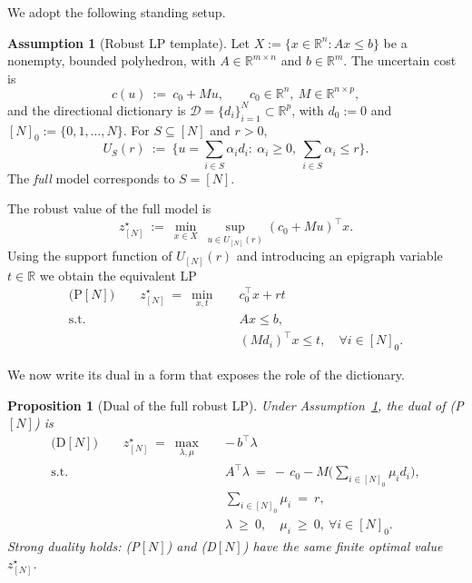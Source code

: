 \documentclass[accepted]{uai2026}
\theoremstyle{plain}
\newtheorem{proposition}[theorem]{Proposition}
\theoremstyle{definition}
\newtheorem{assumption}[theorem]{Assumption}
\theoremstyle{remark}
\newcommand{\R}{\mathbb{R}}
\begin{document}
We adopt the following standing setup.

\begin{assumption}[Robust LP template]
\label{asp:lp-template}
Let $X:=\{x\in\R^n:Ax\le b\}$ be a nonempty, bounded polyhedron, with
$A\in\R^{m\times n}$ and $b\in\R^m$.
The uncertain cost is
\[
c(u)\ :=\ c_0+Mu,\qquad c_0\in\R^n,\ M\in\R^{n\times p},
\]
and the directional dictionary is
$\mathcal D=\{d_i\}_{i=1}^N\subset\R^p$, with $d_0:=0$ and
$[N]_0:=\{0,1,\dots,N\}$.
For $S\subseteq[N]$ and $r>0$,
\[
U_S(r)\ :=\ \Big\{u=\textstyle\sum_{i\in S}\alpha_i d_i:\ \alpha_i\ge 0,\ \sum_{i\in S}\alpha_i\le r\Big\}.
\]
The \emph{full} model corresponds to $S=[N]$.
\end{assumption}

The robust value of the full model is
\[
z_{[N]}^\star
\ :=\
\min_{x\in X}\ \sup_{u\in U_{[N]}(r)} (c_0+Mu)^\top x.
\]
Using the support function of $U_{[N]}(r)$ and introducing an epigraph variable
$t\in\R$ we obtain the equivalent LP
\begin{equation}
\label{eq:full-primal}
\begin{aligned}
\text{(P$[N]$)}\qquad
z_{[N]}^\star
\ =\ \min_{x,t}\quad & c_0^\top x + r t\\
\text{s.t.}\quad & Ax \le b,\\
& (Md_i)^\top x \le t,\quad \forall i\in[N]_0.
\end{aligned}
\end{equation}

We now write its dual in a form that exposes the role of the dictionary.

\begin{proposition}[Dual of the full robust LP]
\label{prop:full-dual}
Under Assumption~\ref{asp:lp-template}, the dual of \emph{(P$[N]$)} is
\begin{equation}
\label{eq:full-dual}
\begin{aligned}
\text{(D$[N]$)}\qquad
z_{[N]}^\star
\ =\ \max_{\lambda,\mu}\quad & -\,b^\top \lambda\\
\text{s.t.}\quad
& A^\top \lambda\ =\ -\,c_0 - M\Big(\textstyle\sum_{i\in[N]_0}\mu_i d_i\Big),\\
& \sum_{i\in[N]_0} \mu_i\ =\ r,\\
& \lambda\ \ge\ 0,\quad \mu_i\ \ge\ 0,\ \forall i\in[N]_0.
\end{aligned}
\end{equation}
Strong duality holds: \emph{(P$[N]$)} and \emph{(D$[N]$)} have the same finite
optimal value $z_{[N]}^\star$.
\end{proposition}
\end{document}
